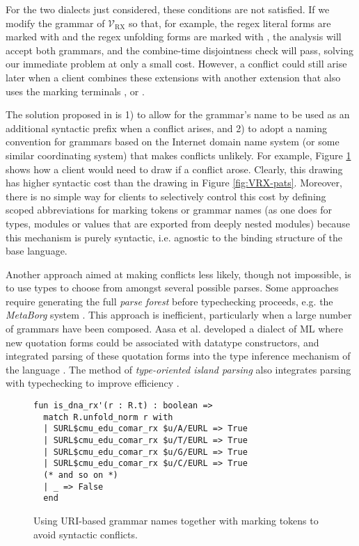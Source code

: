 {For the two dialects just considered, these conditions are not satisfied. If we modify the grammar of $\mathcal{V}_\text{RX}$ so that, for example, the regex literal forms are marked with  and the regex unfolding forms are marked with , the analysis will accept both grammars, and the combine-time disjointness check will pass, solving our immediate problem at only a small cost. However, a conflict could still  arise later when a client combines these extensions with another extension that also uses the marking terminals ,  or \li{/}. %

The solution proposed in \cite{conf/pldi/SchwerdfegerW09} is 1) to allow for the grammar's name to be used as an additional syntactic prefix when a conflict arises, and 2) to adopt a naming convention for grammars  based on the Internet domain name system (or some similar coordinating system) that makes conflicts unlikely. For example, Figure \ref{fig:vanwyk} shows how a client would need to draw  if a conflict arose. Clearly, this drawing has higher syntactic cost than the drawing in Figure \ref{fig:VRX-pats}. Moreover, there is no simple way for clients to selectively control this cost by defining scoped abbreviations for marking tokens or grammar names (as one does for types, modules or values that are exported from deeply nested modules) because this mechanism is purely syntactic, i.e. agnostic to the binding structure of the base language.

Another approach aimed at making conflicts less likely, though not impossible, is to use types to choose from amongst several possible parses. Some approaches require generating the full \emph{parse forest} before typechecking proceeds, e.g. the \emph{MetaBorg} system \cite{bravenboer2005generalized}. This approach is inefficient, particularly when a large number of grammars have been composed. Aasa et al. developed a dialect of ML where new quotation forms could be associated with datatype constructors, and integrated parsing of these quotation forms into the type inference mechanism of the language \cite{DBLP:conf/lfp/AasaPS88}. The method of \emph{type-oriented island parsing} also integrates parsing with typechecking to improve efficiency \cite{DBLP:conf/sfp/SilkensenS12}.

\begin{figure}
\begin{lstlisting}[numbers=none]
fun is_dna_rx'(r : R.t) : boolean => 
  match R.unfold_norm r with 
  | SURL$cmu_edu_comar_rx $u/A/EURL => True 
  | SURL$cmu_edu_comar_rx $u/T/EURL => True
  | SURL$cmu_edu_comar_rx $u/G/EURL => True
  | SURL$cmu_edu_comar_rx $u/C/EURL => True
  (* and so on *)
  | _ => False
  end
\end{lstlisting}
\caption{Using URI-based grammar names together with marking tokens to avoid syntactic conflicts.}
\label{fig:vanwyk}
\end{figure}
}
